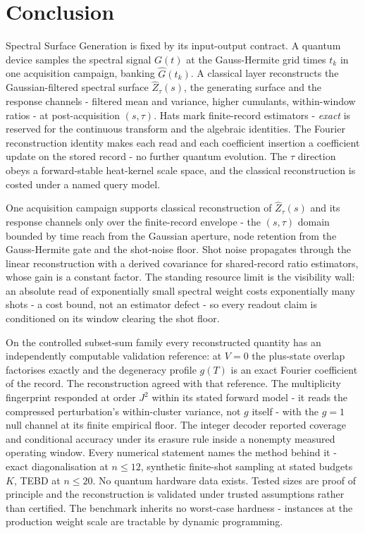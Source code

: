 \section{Conclusion}\label{sec:N8}

Spectral Surface Generation is fixed by its input-output contract. A quantum device samples the spectral signal $G(t)$ at the Gauss-Hermite grid times $t_k$ in one acquisition campaign, banking $\hat{G}(t_k)$. A classical layer reconstructs the Gaussian-filtered spectral surface $\hat{Z}_\tau(s)$, the generating surface and the response channels - filtered mean and variance, higher cumulants, within-window ratios - at post-acquisition $(s,\tau)$. Hats mark finite-record estimators - \emph{exact} is reserved for the continuous transform and the algebraic identities. The Fourier reconstruction identity makes each read and each coefficient insertion a coefficient update on the stored record - no further quantum evolution. The $\tau$ direction obeys a forward-stable heat-kernel scale space, and the classical reconstruction is costed under a named query model.

One acquisition campaign supports classical reconstruction of $\hat{Z}_\tau(s)$ and its response channels only over the finite-record envelope - the $(s,\tau)$ domain bounded by time reach from the Gaussian aperture, node retention from the Gauss-Hermite gate and the shot-noise floor. Shot noise propagates through the linear reconstruction with a derived covariance for shared-record ratio estimators, whose gain is a constant factor. The standing resource limit is the visibility wall: an absolute read of exponentially small spectral weight costs exponentially many shots - a cost bound, not an estimator defect - so every readout claim is conditioned on its window clearing the shot floor.

On the controlled subset-sum family every reconstructed quantity has an independently computable validation reference: at $V = 0$ the plus-state overlap factorises exactly and the degeneracy profile $g(T)$ is an exact Fourier coefficient of the record. The reconstruction agreed with that reference. The multiplicity fingerprint responded at order $J^2$ within its stated forward model - it reads the compressed perturbation's within-cluster variance, not $g$ itself - with the $g = 1$ null channel at its finite empirical floor. The integer decoder reported coverage and conditional accuracy under its erasure rule inside a nonempty measured operating window. Every numerical statement names the method behind it - exact diagonalisation at $n \le 12$, synthetic finite-shot sampling at stated budgets $K$, TEBD at $n \le 20$. No quantum hardware data exists. Tested sizes are proof of principle and the reconstruction is validated under trusted assumptions rather than certified. The benchmark inherits no worst-case hardness - instances at the production weight scale are tractable by dynamic programming.

